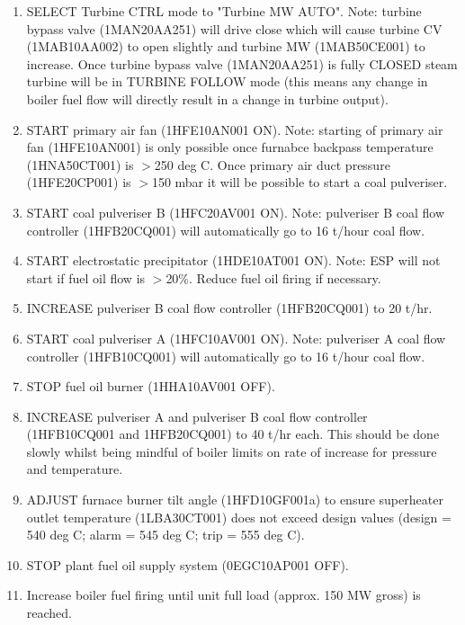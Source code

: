 \documentclass[10pt,a4paper]{article}
\begin{document}
\begin{enumerate}
\item SELECT Turbine CTRL mode to "Turbine MW AUTO". Note: turbine bypass valve (1MAN20AA251) will drive close which will cause turbine CV (1MAB10AA002) to open slightly and turbine MW (1MAB50CE001) to increase. Once turbine bypass valve (1MAN20AA251) is fully CLOSED steam turbine will be in TURBINE FOLLOW mode (this means any change in boiler fuel flow will directly result in a change in turbine output).
\item START primary air fan (1HFE10AN001 ON). Note: starting of primary air fan (1HFE10AN001) is only possible once furnabce backpass temperature (1HNA50CT001) is $>$250 deg C. Once primary air duct pressure (1HFE20CP001) is $>$150 mbar it will be possible to start a coal pulveriser.
\item START coal pulveriser B (1HFC20AV001 ON). Note: pulveriser B coal flow controller (1HFB20CQ001) will automatically go to 16 t/hour coal flow.
\item START electrostatic precipitator (1HDE10AT001 ON). Note: ESP will not start if fuel oil flow is $>$20\%. Reduce fuel oil firing if necessary.
\item INCREASE pulveriser B coal flow controller (1HFB20CQ001) to 20 t/hr.
\item START coal pulveriser A (1HFC10AV001 ON). Note: pulveriser A coal flow controller (1HFB10CQ001) will automatically go to 16 t/hour coal flow.
\item STOP fuel oil burner (1HHA10AV001 OFF).
\item INCREASE pulveriser A and pulveriser B coal flow controller (1HFB10CQ001 and 1HFB20CQ001) to 40 t/hr each. This should be done slowly whilst being mindful of boiler limits on rate of increase for pressure and temperature.
\item ADJUST furnace burner tilt angle (1HFD10GF001a) to ensure superheater outlet temperature (1LBA30CT001) does not exceed design values (design = 540 deg C; alarm = 545 deg C; trip = 555 deg C).
\item STOP plant fuel oil supply system (0EGC10AP001 OFF).
\item Increase boiler fuel firing until unit full load (approx. 150 MW gross) is reached.
\end{enumerate}


\vspace*{2cm}
\end{document}
